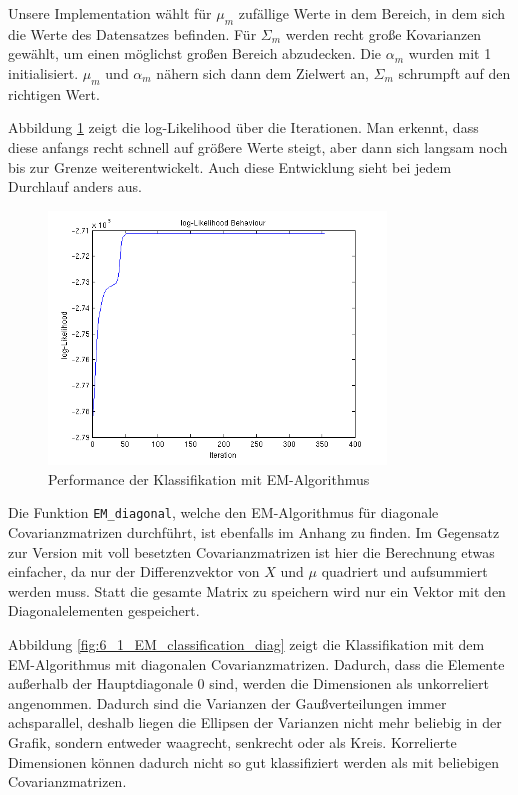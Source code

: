Unsere Implementation wählt für $\mu_m$ zufällige Werte in dem Bereich, in dem sich die Werte des Datensatzes befinden. Für $\Sigma_m$ werden recht große Kovarianzen gewählt, um einen möglichst großen Bereich abzudecken. Die $\alpha_m$ wurden mit 1 initialisiert. $\mu_m$ und $\alpha_m$ nähern sich dann dem Zielwert an, $\Sigma_m$ schrumpft auf den richtigen Wert.

Abbildung \ref{fig:6_1_EM_performance} zeigt die log-Likelihood über die Iterationen. Man erkennt, dass diese anfangs recht schnell auf größere Werte steigt, aber dann sich langsam noch bis zur Grenze weiterentwickelt. Auch diese Entwicklung sieht bei jedem Durchlauf anders aus.

\begin{figure}[h!]
  \centering
	\includegraphics[width=0.8\textwidth]{./figures/6_1_EM_perf.png}
	\caption{Performance der Klassifikation mit EM-Algorithmus}
	\label{fig:6_1_EM_performance}
\end{figure}

Die Funktion \texttt{EM\_diagonal}, welche den EM-Algorithmus für diagonale Covarianzmatrizen durchführt, ist ebenfalls im Anhang zu finden. Im Gegensatz zur Version mit voll besetzten Covarianzmatrizen ist hier die Berechnung etwas einfacher, da nur der Differenzvektor von $X$ und $\mu$ quadriert und aufsummiert werden muss. Statt die gesamte Matrix zu speichern wird nur ein Vektor mit den Diagonalelementen gespeichert.

Abbildung \ref{fig:6_1_EM_classification_diag} zeigt die Klassifikation mit dem EM-Algorithmus mit diagonalen Covarianzmatrizen. Dadurch, dass die Elemente außerhalb der Hauptdiagonale 0 sind, werden die Dimensionen als unkorreliert angenommen. Dadurch sind die Varianzen der Gaußverteilungen immer achsparallel, deshalb liegen die Ellipsen der Varianzen nicht mehr beliebig in der Grafik, sondern entweder waagrecht, senkrecht oder als Kreis. Korrelierte Dimensionen können dadurch nicht so gut klassifiziert werden als mit beliebigen Covarianzmatrizen.

